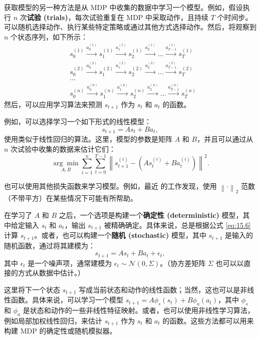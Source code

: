 获取模型的另一种方法是从 MDP 中收集的数据中学习一个模型。例如，假设执行 $n$ 次\textbf{试验 (trials)}，每次试验重复在 MDP 中采取动作，且持续 $T$ 个时间步。可以随机选择动作、执行某些特定策略或通过其他方式选择动作。然后，将观察到 $n$ 个状态序列，如下所示：
\begin{align*}
    &s_0^{(1)} \xrightarrow{a_0^{(1)}} s_1^{(1)} \xrightarrow{a_1^{(1)}} s_2^{(1)} \xrightarrow{a_2^{(1)}} \dots \xrightarrow{a_{T-1}^{(1)}} s_T^{(1)} \\
    &s_0^{(2)} \xrightarrow{a_0^{(2)}} s_1^{(2)} \xrightarrow{a_1^{(2)}} s_2^{(2)} \xrightarrow{a_2^{(2)}} \dots \xrightarrow{a_{T-1}^{(2)}} s_T^{(2)} \\
    &\dots \\
    &s_0^{(n)} \xrightarrow{a_0^{(n)}} s_1^{(n)} \xrightarrow{a_1^{(n)}} s_2^{(n)} \xrightarrow{a_2^{(n)}} \dots \xrightarrow{a_{T-1}^{(n)}} s_T^{(n)}
\end{align*}
然后，可以应用学习算法来预测 $s_{t+1}$ 作为 $s_t$ 和 $a_t$ 的函数。

例如，可以选择学习一个如下形式的线性模型：
\begin{equation}
    s_{t+1} = As_t + Ba_t,
    \label{eq:15.6}
\end{equation}
使用类似于线性回归的算法。这里，模型的参数是矩阵 $A$ 和 $B$，并且可以通过从 $n$ 次试验中收集的数据来估计它们：
\[
    \underset{A,B}{\arg \min} \sum_{i=1}^n \sum_{t=0}^{T-1} \left\| s_{t+1}^{(i)} - (As_t^{(i)} + Ba_t^{(i)}) \right\|^2.
\]

也可以使用其他损失函数来学习模型。例如，最近 \cite{luo2018algorithmic} 的工作发现，使用 $\left\| \cdot \right\|_2$ 范数（不带平方）在某些情况下可能有所帮助。

在学习了 $A$ 和 $B$ 之后，一个选项是构建一个\textbf{确定性 (deterministic)} 模型，其中给定输入 $s_t$ 和 $a_t$，输出 $s_{t+1}$ 被精确确定。具体来说，总是根据公式 \eqref{eq:15.6} 计算 $s_{t+1}$。或者，也可以构建一个\textbf{随机 (stochastic)} 模型，其中 $s_{t+1}$ 是输入的随机函数，通过将其建模为：
\[
    s_{t+1} = As_t + Ba_t + \epsilon_t,
\]
其中 $\epsilon_t$ 是一个噪声项，通常建模为 $\epsilon_t \sim \mathcal{N}(0, \Sigma)$。（协方差矩阵 $\Sigma$ 也可以以直接的方式从数据中估计。）

这里将下一个状态 $s_{t+1}$ 写成当前状态和动作的线性函数；当然，这也可以是非线性函数。具体来说，可以学习一个模型 $s_{t+1} = A\phi_s(s_t) + B\phi_a(a_t)$，其中 $\phi_s$ 和 $\phi_a$ 是状态和动作的一些非线性特征映射。或者，也可以使用非线性学习算法，例如局部加权线性回归，来估计 $s_{t+1}$ 作为 $s_t$ 和 $a_t$ 的函数。这些方法都可以用来构建 MDP 的确定性或随机模拟器。

